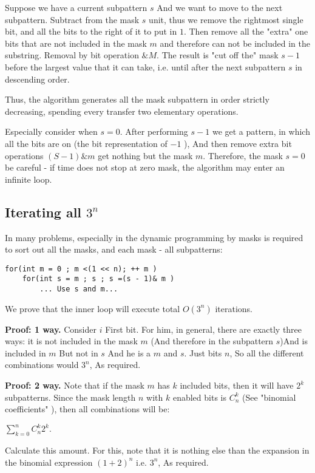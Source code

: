 Suppose we have a current subpattern $s$ And we want to move to the next subpattern. Subtract from the mask $s$ unit, thus we remove the rightmost single bit, and all the bits to the right of it to put in $1$. Then remove all the "extra" one bits that are not included in the mask $m$ and therefore can not be included in the substring. Removal by bit operation $\& M$. The result is "cut off the" mask $s-1$ before the largest value that it can take, i.e. until after the next subpattern $s$ in descending order.

Thus, the algorithm generates all the mask subpattern in order strictly decreasing, spending every transfer two elementary operations.

Especially consider when $s = 0$. After performing $s-1$ we get a pattern, in which all the bits are on (the bit representation of $-1$ ), And then remove extra bit operations $(S-1) \& m$ get nothing but the mask $m$. Therefore, the mask $s = 0$ be careful - if time does not stop at zero mask, the algorithm may enter an infinite loop.

\subsection{ Iterating all $3 ^ n$}

In many problems, especially in the dynamic programming by masks is required to sort out all the masks, and each mask - all subpatterns:

\begin{verbatim}
for(int m = 0 ; m <(1 << n); ++ m )
    for(int s = m ; s ; s =(s - 1)& m )
        ... Use s and m...
\end{verbatim}
We prove that the inner loop will execute total $O (3 ^ n)$ iterations.

\textbf{Proof: 1 way.} Consider $i$ First bit. For him, in general, there are exactly three ways: it is not included in the mask $m$ (And therefore in the subpattern $s$)And is included in $m$ But not in $s$ And he is a $m$ and $s$. Just bits $n$, So all the different combinations would $3 ^ n$, As required.

\textbf{Proof: 2 way.} Note that if the mask $m$ has $k$ included bits, then it will have $2 ^ k$ subpatterns. Since the mask length $n$ with $k$ enabled bits is $C_n ^ k$ (See "binomial coefficients" ), then all combinations will be:

$\sum_ {k = 0} ^ n C_n ^ k 2 ^ k.$

Calculate this amount. For this, note that it is nothing else than the expansion in the binomial expression $(1 +2) ^ n$ i.e. $3 ^ n$, As required.


